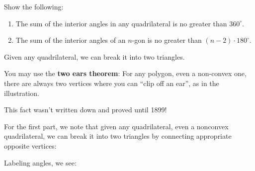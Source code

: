 \documentclass[instructornotes]{ximera}
\begin{document}
\begin{problem}
Show the following:
\begin{enumerate}
\item The sum of the interior angles in any quadrilateral is no greater than $360^\circ$.
\item The sum of the interior angles of an $n$-gon is no greater than
$\left( n-2\right)\cdot180^\circ$.
\end{enumerate}

\begin{hint}
Given any quadrilateral, we can break it into two triangles. 
\end{hint}
\begin{hint}
You may use the \textbf{two ears theorem}: For any polygon, even a non-convex
one, there are always two vertices where you can ``clip off an ear'', as in the
illustration.
\begin{image}
\end{image}
This fact wasn't written down and proved until 1899!
\end{hint}
\begin{freeResponse}
For the first part, we note that given any quadrilateral, even a
nonconvex quadrilateral, we can break it into two triangles by
connecting appropriate opposite vertices:
\begin{image}
\end{image}
Labeling angles, we see:
\begin{image}
\end{image}
\end{freeResponse}
\end{problem}
\end{document}
